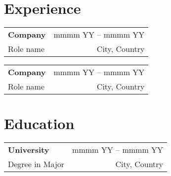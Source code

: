 \documentclass[11pt]{article}
\newcommand{\displayfullname}{%
    \begin{center}
    {\fontsize{\namefontsize}{\dimexpr1.2\namefontsize}\selectfont\fullname}
    \end{center}
    \namesep %
}
\newcommand{\displaycontactinfo}{%
  \begin{center}
    \ifthenelse{\isundefined{\mylocation}}{}{%
        \mylocation\separator
    }%
    \ifthenelse{\isundefined{\mytel}}{}{%
        \mytel\separator
    }%
    \ifthenelse{\isundefined{\myemail}}{}{%
        \myemail\separator
    }%
    \ifthenelse{\isundefined{\mygithub}}{}{%
        \mygithub\separator
    }%
    \ifthenelse{\isundefined{\mylinkedin}}{}{%
        \mylinkedin
    }%
    \end{center}
}
\newcommand{\namefontsize}{14pt}
\newcommand{\namesep}{\vspace{0.5em}}
\newcommand{\separator}{\ | \ }
\begin{document}
\displayfullname
\displaycontactinfo

\vspace{0.75em}

\kant[1][1]

\vspace{0.5em}

\section*{Experience\hspace{0.5em}\hrulefill}

\vspace{0.35em}

\begin{tabularx}{\textwidth}{@{}X r@{}} %
	\fontsize{14pt}{0pt}\selectfont\textbf{Company} & mmmm YY – mmmm YY \\
	Role name                                       & City, Country     \\
\end{tabularx}

\vspace{0.1em}

\blinditemize[3]

\vspace{0.75em}

\begin{tabularx}{\textwidth}{@{}X r@{}} %
	\fontsize{14pt}{0pt}\selectfont\textbf{Company} & mmmm YY – mmmm YY \\
	Role name                                       & City, Country     \\
\end{tabularx}

\vspace{0.1em}

\blinditemize[3]

\vspace{0.5em}

\section*{Education\hspace{0.5em}\hrulefill}

\vspace{0.35em}

\begin{tabularx}{\textwidth}{@{}X r@{}} %
	\fontsize{14pt}{0pt}\selectfont\textbf{University} & mmmm YY – mmmm YY \\
	Degree in Major                                    & City, Country     \\
\end{tabularx}
\end{document}
